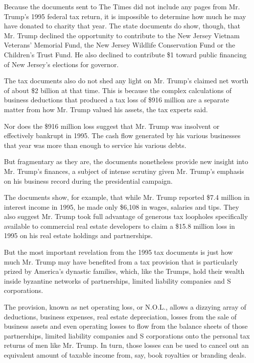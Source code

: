 Because the documents sent to The Times did not include any pages from
Mr. Trump's 1995 federal tax return, it is impossible to determine how
much he may have donated to charity that year. The state documents do
show, though, that Mr. Trump declined the opportunity to contribute to
the New Jersey Vietnam Veterans' Memorial Fund, the New Jersey Wildlife
Conservation Fund or the Children's Trust Fund. He also declined to
contribute \$1 toward public financing of New Jersey's elections for
governor.

The tax documents also do not shed any light on Mr. Trump's claimed net
worth of about \$2 billion at that time. This is because the complex
calculations of business deductions that produced a tax loss of \$916
million are a separate matter from how Mr. Trump valued his assets, the
tax experts said.

Nor does the \$916 million loss suggest that Mr. Trump was insolvent or
effectively bankrupt in 1995. The cash flow generated by his various
businesses that year was more than enough to service his various debts.

But fragmentary as they are, the documents nonetheless provide new
insight into Mr. Trump's finances, a subject of intense scrutiny given
Mr. Trump's emphasis on his business record during the presidential
campaign.

The documents show, for example, that while Mr. Trump reported \$7.4
million in interest income in 1995, he made only \$6,108 in wages,
salaries and tips. They also suggest Mr. Trump took full advantage of
generous tax loopholes specifically available to commercial real estate
developers to claim a \$15.8 million loss in 1995 on his real estate
holdings and partnerships.

But the most important revelation from the 1995 tax documents is just
how much Mr. Trump may have benefited from a tax provision that is
particularly prized by America's dynastic families, which, like the
Trumps, hold their wealth inside byzantine networks of partnerships,
limited liability companies and S corporations.

The provision, known as net operating loss, or N.O.L., allows a dizzying
array of deductions, business expenses, real estate depreciation, losses
from the sale of business assets and even operating losses to flow from
the balance sheets of those partnerships, limited liability companies
and S corporations onto the personal tax returns of men like Mr. Trump.
In turn, those losses can be used to cancel out an equivalent amount of
taxable income from, say, book royalties or branding deals.

